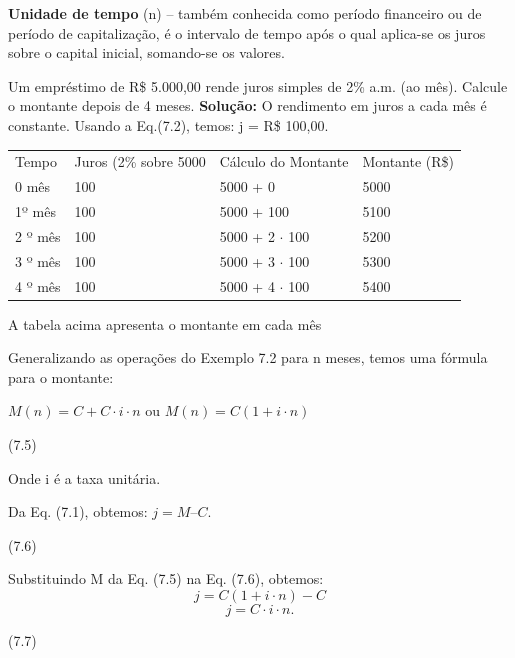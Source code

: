 \textbf{Unidade de tempo} (n) – também conhecida como período financeiro ou de período de capitalização, é o intervalo de tempo após o qual aplica-se os juros sobre o capital inicial, somando-se os valores.

\begin{texemplo}
	Um empréstimo de R\$ 5.000,00 rende juros simples de 2\% a.m. (ao mês). Calcule o montante depois de 4 meses.
	\textbf{Solução:} O rendimento em juros a cada mês é constante. Usando a Eq.(7.2), temos: j = R\$ 100,00. 

	\begin{table}[H]
		\centering
		\begin{tabular}{llll}
		Tempo   & Juros (2\% sobre 5000 & Cálculo do Montante & Montante (R\$) \\
		0 mês   & 100                   & 5000 + 0            & 5000           \\
		1º mês  & 100                   & 5000 + 100          & 5100           \\
		2 º mês & 100                   & 5000 + 2 $\cdot$ 100      & 5200           \\
		3 º mês & 100                   & 5000 + 3 $\cdot$ 100       & 5300           \\
		4 º mês & 100                   & 5000 + 4 $\cdot$ 100      & 5400          
		\end{tabular}
	\end{table}

A tabela acima apresenta o montante em cada mês \qedsymbol{}

\end{texemplo}

Generalizando as operações do Exemplo 7.2 para n meses, temos uma fórmula para o montante: 

$M(n) = C + C \cdot i \cdot n$ ou $M(n) = C (1 + i \cdot n)$
\begin{flushright}
	(7.5)
\end{flushright}

Onde i é a taxa unitária.

Da Eq. (7.1), obtemos:
$j = M – C$.
\begin{flushright}
	(7.6)
\end{flushright}

Substituindo M da Eq. (7.5) na Eq. (7.6), obtemos:
$$j=C(1 + i \cdot n) -C$$
$$j=C \cdot i \cdot n.$$
\begin{flushright}
	(7.7)
\end{flushright}

